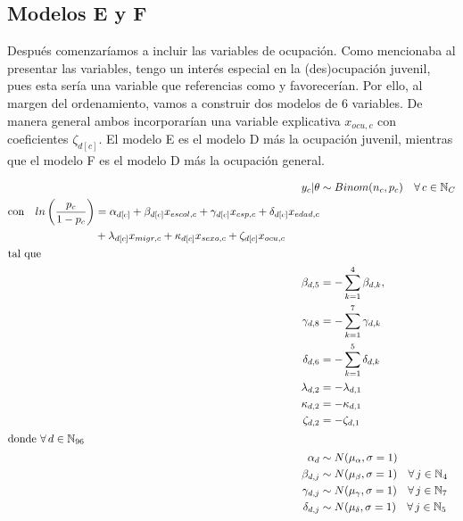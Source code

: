 \subsection*{Modelos E y F}

Después comenzaríamos a incluir las variables de ocupación. Como mencionaba al presentar las variables, tengo un interés especial en la (des)ocupación juvenil, pues esta sería una variable que referencias como \textcite{LeBras16} y \textcite{Perrineau07} favorecerían. Por ello, al margen del ordenamiento, vamos a construir dos modelos de 6 variables. De manera general ambos incorporarían una variable explicativa $x_{ocu,c}$ con coeficientes $\zeta_{d[c]}$. El modelo E es el modelo D más la ocupación juvenil, mientras que el modelo F es el modelo D más la ocupación general. 

\begin{align}\label{eq:Modelo_Comp_EF}
y_c|\theta & \sim Binom(n_c,p_c) \quad \forall \, c \in \mathbb{N}_C \nonumber \\
\begin{split}
\text{con} \quad ln\left(\dfrac{p_c}{1-p_c}\right) &= \alpha_{d[c]} + \beta_{d[c]} x_{escol,c} + \gamma_{d[c]} x_{csp,c} + \delta_{d[c]} x_{edad,c} \\
&+ \lambda_{d[c]} x_{migr,c} + \kappa_{d[c]} x_{sexo,c} + \zeta_{d[c]} x_{ocu,c} 
\end{split}\\
\intertext{tal que} 
\beta_{d,5} &= -\sum\limits_{k = 1}^{4} \beta_{d,k}, \nonumber \\
\gamma_{d,8} &= -\sum\limits_{k = 1}^{7} \gamma_{d,k} \nonumber \\
\delta_{d,6} &= -\sum\limits_{k = 1}^{5} \delta_{d,k} \nonumber \\
\lambda_{d,2} &= -\lambda_{d,1} \nonumber \\
\kappa_{d,2} &= -\kappa_{d,1} \nonumber \\
\zeta_{d,2} &= -\zeta_{d,1} \nonumber \\
\intertext{donde $\forall \, d \in \mathbb{N}_{96}$}
\alpha_d &\sim N(\mu_{\alpha}, \sigma=1) \quad  \nonumber \\
\beta_{d,j} &\sim N(\mu_{\beta}, \sigma=1) \quad \forall \, j \in \mathbb{N}_{4} \nonumber \\
\gamma_{d,j} &\sim N(\mu_{\gamma}, \sigma=1) \quad \forall \, j \in \mathbb{N}_{7} \nonumber \\
\delta_{d,j} &\sim N(\mu_{\delta}, \sigma=1) \quad \forall \, j \in \mathbb{N}_{5}  \nonumber \\ 

\end{align}
